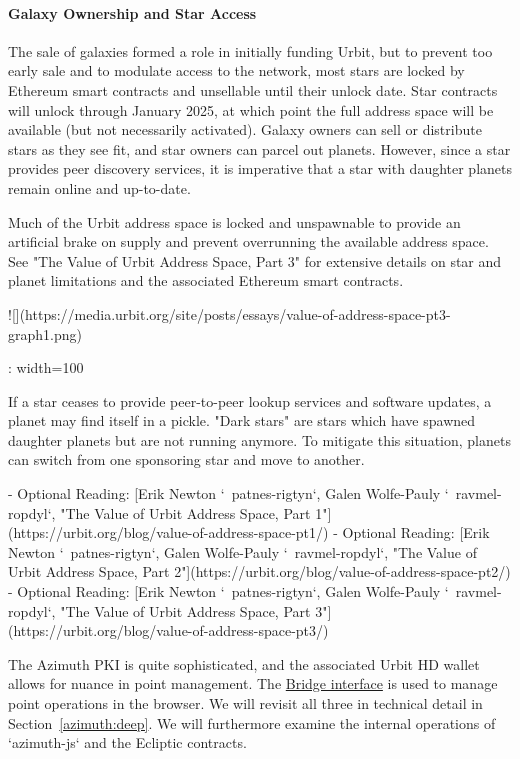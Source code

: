{{{\paragraph{Galaxy Ownership and Star Access}

The sale of galaxies formed a role in initially funding Urbit, but to prevent too early sale and to modulate access to the network, most stars are locked by Ethereum smart contracts and unsellable until their unlock date.  Star contracts will unlock through January 2025, at which point the full address space will be available (but not necessarily activated).  Galaxy owners can sell or distribute stars as they see fit, and star owners can parcel out planets.  However, since a star provides peer discovery services, it is imperative that a star with daughter planets remain online and up-to-date.

Much of the Urbit address space is locked and unspawnable to provide an artificial brake on supply and prevent overrunning the available address space.  See "The Value of Urbit Address Space, Part 3" for extensive details on star and planet limitations and the associated Ethereum smart contracts.

![](https://media.urbit.org/site/posts/essays/value-of-address-space-pt3-graph1.png){: width=100%

If a star ceases to provide peer-to-peer lookup services and software updates, a planet may find itself in a pickle.  "Dark stars" are stars which have spawned daughter planets but are not running anymore.  To mitigate this situation, planets can switch from one sponsoring star and move to another.

- Optional Reading: [Erik Newton `~patnes-rigtyn`, Galen Wolfe-Pauly `~ravmel-ropdyl`, "The Value of Urbit Address Space, Part 1"](https://urbit.org/blog/value-of-address-space-pt1/)
- Optional Reading: [Erik Newton `~patnes-rigtyn`, Galen Wolfe-Pauly `~ravmel-ropdyl`, "The Value of Urbit Address Space, Part 2"](https://urbit.org/blog/value-of-address-space-pt2/)
- Optional Reading: [Erik Newton `~patnes-rigtyn`, Galen Wolfe-Pauly `~ravmel-ropdyl`, "The Value of Urbit Address Space, Part 3"](https://urbit.org/blog/value-of-address-space-pt3/)

The Azimuth PKI is quite sophisticated, and the associated Urbit HD wallet allows for nuance in point management.  The \href{https://bridge.urbit.org/}{Bridge interface} is used to manage point operations in the browser.  We will revisit all three in technical detail in Section~\ref{azimuth:deep}.  We will furthermore examine the internal operations of `azimuth-js` and the Ecliptic contracts.


}}}}
